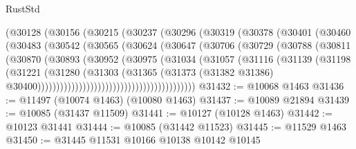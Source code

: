 \begin{lexlean}{RustStd}
\begin{coremodule}
                        (@30128
                          (@30156
                            (@30215
                              (@30237
                                (@30296
                                  (@30319
                                    (@30378
                                      (@30401
                                        (@30460
                                          (@30483
                                            (@30542
                                              (@30565
                                                (@30624
                                                  (@30647
                                                    (@30706
                                                      (@30729
                                                        (@30788
                                                          (@30811
                                                            (@30870
                                                              (@30893
                                                                (@30952
                                                                  (@30975
                                                                    (@31034
                                                                      (@31057
                                                                        (@31116
                                                                          (@31139
                                                                            (@31198
                                                                              (@31221
                                                                                (@31280
                                                                                  (@31303
                                                                                    (@31365
                                                                                      (@31373
                                                                                        (@31382
                                                                                          @31386)
                                                                                        @30400))))))))))))))))))))))))))))))))))))))))))
@31432 := @10068 @1463
@31436 := @11497 (@10074 @1463) (@10080 @1463)
@31437 := @10089 @21894
@31439 := @10085 (@31437 @11509)
@31441 := @10127 (@10128 @1463)
@31442 := @10123 @31441
@31444 := @10085 (@31442 @11523)
@31445 := @11529 @1463
@31450 := @31445 @11531 @10166 @10138 @10142 @10145

\end{coremodule}
\end{lexlean}
